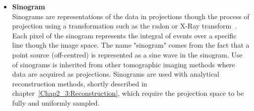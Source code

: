 \begin{itemize}
\item\textbf{Sinogram}\\
Sinograms are representations of the data in projections though the process of projection using a transformation such as the radon or X-Ray transform~\cite{Natterer1986}. Each pixel of the sinogram represents the integral of events over a specific line though the image space. The name "sinogram" comes from the fact that a point source (off-centred) is represented as a sine wave in the sinogram.
Use of sinograms is inherited from other tomographic imaging methods where data are acquired as projections. Sinograms are used with analytical reconstruction methods, shortly described in chapter~\ref{Chap2_3:Reconstruction}, which require the projection space to be fully and uniformly sampled.
%
%
\end{itemize}

